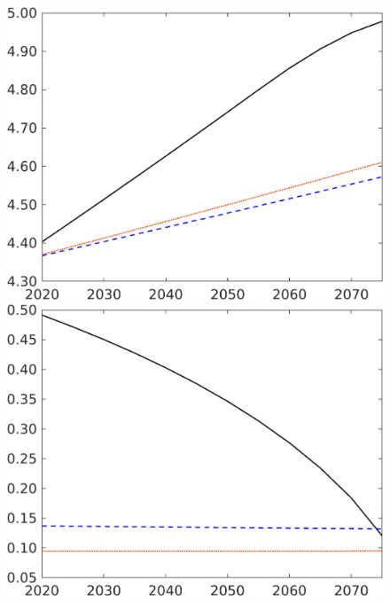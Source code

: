 \begin{figure}[h!!]
\begin{minipage}[]{0.32\textwidth}
\end{minipage}
\begin{minipage}[]{0.32\textwidth}
	\includegraphics[width=1\textwidth]{../../codding_model/own_basedOnFried/optimalPol_elastS_DisuSci/figures/all_1705/Extern_CompEff_An_spillover0_noskill0_sep1_BN0_ineq0_red0_etaa0.79_lgd0.png}
\end{minipage}
\begin{minipage}[]{0.32\textwidth}
	\includegraphics[width=1\textwidth]{../../codding_model/own_basedOnFried/optimalPol_elastS_DisuSci/figures/all_1705/Extern_CompEff_sg_spillover0_noskill0_sep1_BN0_ineq0_red0_etaa0.79_lgd0.png}

\end{minipage}
\end{figure}
